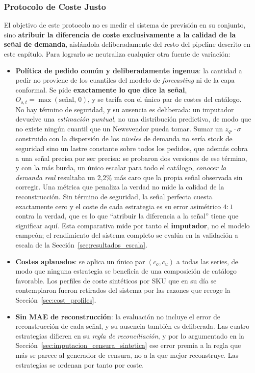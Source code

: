 \subsubsection{Protocolo de Coste Justo}
\label{sec:fair_cost_protocol}

El objetivo de este protocolo no es medir el sistema de previsión en su conjunto, sino \textbf{atribuir la diferencia de coste exclusivamente a la calidad de la señal de demanda}, aislándola deliberadamente del resto del pipeline descrito en este capítulo. Para lograrlo se neutraliza cualquier otra fuente de variación:

\begin{itemize}
    \item \textbf{Política de pedido común y deliberadamente ingenua}: la cantidad a pedir no proviene de los cuantiles del modelo de \textit{forecasting} ni de la capa conformal. Se pide \textbf{exactamente lo que dice la señal}, $O_{s,t} = \max(\text{señal},\,0)$, y se tarifa con el único par de costes del catálogo. No hay término de seguridad, y su ausencia es deliberada: un imputador devuelve una \emph{estimación puntual}, no una distribución predictiva, de modo que no existe ningún cuantil que un Newsvendor pueda tomar. Sumar un $z_{q^\star}\cdot\sigma$ construido con la dispersión de los \emph{niveles} de demanda no sería stock de seguridad sino un lastre constante sobre todos los pedidos, que además cobra a una señal precisa por ser precisa: se probaron dos versiones de ese término, y con la más burda, un único escalar para todo el catálogo, \emph{conocer la demanda real} resultaba un 2{,}2\% más caro que la propia señal observada sin corregir. Una métrica que penaliza la verdad no mide la calidad de la reconstrucción. Sin término de seguridad, la señal perfecta cuesta exactamente cero y el coste de cada estrategia es su error asimétrico $4{:}1$ contra la verdad, que es lo que ``atribuir la diferencia a la señal'' tiene que significar aquí. Esta comparativa mide por tanto el \textbf{imputador}, no el modelo campeón; el rendimiento del sistema completo se evalúa en la validación a escala de la Sección~\ref{sec:resultados_escala}.
    \item \textbf{Costes aplanados}: se aplica un único par $(c_o, c_u)$ a todas las series, de modo que ninguna estrategia se beneficia de una composición de catálogo favorable. Los perfiles de coste sintéticos por SKU que en su día se contemplaron fueron retirados del sistema por las razones que recoge la Sección~\ref{sec:cost_profiles}.
    \item \textbf{Sin MAE de reconstrucción}: la evaluación no incluye el error de reconstrucción de cada señal, y su ausencia también es deliberada. Las cuatro estrategias difieren en su \emph{regla de reconciliación}, y por lo argumentado en la Sección~\ref{sec:imputacion_censura_sintetica} ese error premia a la regla que más se parece al generador de censura, no a la que mejor reconstruye. Las estrategias se ordenan por tanto por coste.

\end{itemize}
